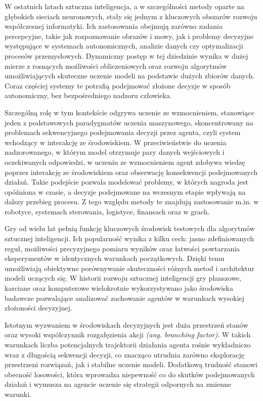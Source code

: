 W ostatnich latach sztuczna inteligencja, a w szczególności metody oparte na głębokich sieciach neuronowych, stały się jednym z kluczowych obszarów rozwoju współczesnej informatyki. Ich zastosowania obejmują zarówno zadania percepcyjne, takie jak rozpoznawanie obrazów i mowy, jak i problemy decyzyjne występujące w systemach autonomicznych, analizie danych czy optymalizacji procesów przemysłowych. Dynamiczny postęp w tej dziedzinie wynika w dużej mierze z rosnących możliwości obliczeniowych oraz rozwoju algorytmów umożliwiających skuteczne uczenie modeli na podstawie dużych zbiorów danych. Coraz częściej systemy te potrafią podejmować złożone decyzje w sposób autonomiczny, bez bezpośredniego nadzoru człowieka.

Szczególną rolę w tym kontekście odgrywa uczenie ze wzmocnieniem, stanowiące jeden z podstawowych paradygmatów uczenia maszynowego, skoncentrowany na problemach sekwencyjnego podejmowania decyzji przez agenta, czyli system wchodzący w interakcję ze środowiskiem. W przeciwieństwie do uczenia nadzorowanego, w którym model otrzymuje pary danych wejściowych i oczekiwanych odpowiedzi, w uczeniu ze wzmocnieniem agent zdobywa wiedzę poprzez interakcję ze środowiskiem oraz obserwację konsekwencji podejmowanych działań. Takie podejście pozwala modelować problemy, w których nagroda jest opóźniona w czasie, a decyzje podejmowane na wczesnym etapie wpływają na dalszy przebieg procesu. Z tego względu metody te znajdują zastosowanie m.in. w robotyce, systemach sterowania, logistyce, finansach oraz w grach.

Gry od wielu lat pełnią funkcję kluczowych środowisk testowych dla algorytmów sztucznej inteligencji. Ich popularność wynika z kilku cech: jasno zdefiniowanych reguł, możliwości precyzyjnego pomiaru wyników oraz łatwości powtarzania eksperymentów w identycznych warunkach początkowych. Dzięki temu umożliwiają obiektywne porównywanie skuteczności różnych metod i architektur modeli uczących się. W historii rozwoju sztucznej inteligencji gry planszowe, karciane oraz komputerowe wielokrotnie wykorzystywano jako środowiska badawcze pozwalające analizować zachowanie agentów w warunkach wysokiej złożoności decyzyjnej.

Istotnym wyzwaniem w środowiskach decyzyjnych jest duża przestrzeń stanów oraz wysoki współczynnik rozgałęzienia akcji \textit{(ang. branching factor)}. W takich warunkach liczba potencjalnych trajektorii działania agenta rośnie wykładniczo wraz z długością sekwencji decyzji, co znacząco utrudnia zarówno eksplorację przestrzeni rozwiązań, jak i stabilne uczenie modeli. Dodatkową trudność stanowi obecność losowości, która wprowadza niepewność co do skutków podejmowanych działań i wymusza na agencie uczenie się strategii odpornych na zmienne warunki.


